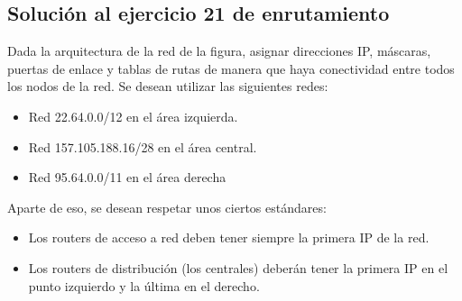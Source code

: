 \documentclass[letterpaper,10pt,spanish]{sphinxmanual}
\begin{document}
\subsection{Solución al ejercicio 21 de enrutamiento}
\label{\detokenize{t2_integracion_elementos/ejercicios_subredes_ipv4/ejercicios_dos_router:solucion-al-ejercicio-21-de-enrutamiento}}
\sphinxAtStartPar
Dada la arquitectura de la red de la figura, asignar direcciones IP, máscaras, puertas de enlace y tablas de rutas de manera que haya conectividad entre todos
los nodos de la red. Se desean utilizar las siguientes redes:
\begin{itemize}
\item {} 
\sphinxAtStartPar
Red 22.64.0.0/12 en el área izquierda.

\item {} 
\sphinxAtStartPar
Red 157.105.188.16/28 en el área central.

\item {} 
\sphinxAtStartPar
Red 95.64.0.0/11 en el área derecha

\end{itemize}

\begin{figure}[htbp]
\centering

\noindent{}
\end{figure}

\sphinxAtStartPar
Aparte de eso, se desean respetar unos ciertos estándares:
\begin{itemize}
\item {} 
\sphinxAtStartPar
Los routers de acceso a red deben tener siempre la primera IP de la red.

\item {} 
\sphinxAtStartPar
Los routers de distribución (los centrales) deberán tener la primera IP en el punto izquierdo y la última en el derecho.

\end{itemize}
\end{document}
